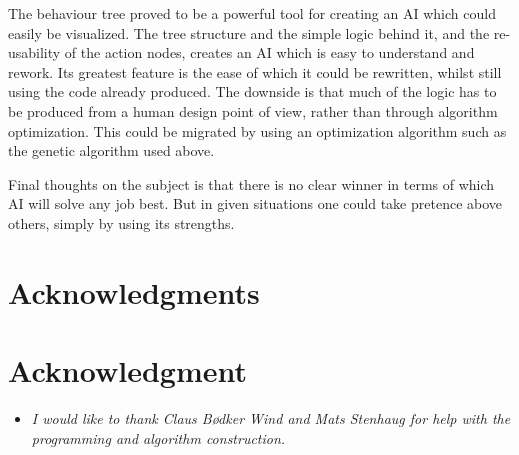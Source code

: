 \documentclass[conference,compsoc]{IEEEtran}
\begin{document}
The behaviour tree proved to be a powerful tool for creating an AI which could easily be visualized. The tree structure and the simple logic behind it, and the re-usability of the action nodes, creates an AI which is easy to understand and rework. Its greatest feature is the ease of which it could be rewritten, whilst still using the code already produced. The downside is that much of the logic has to be produced from a human design point of view, rather than through algorithm optimization. This could be migrated by using an optimization algorithm such as the genetic algorithm used above. 

Final thoughts on the subject is that there is no clear winner in terms of which AI will solve any job best. But in given situations one could take pretence above others, simply by using its strengths. 




\ifCLASSOPTIONcompsoc
  \section*{Acknowledgments}
\else
  \section*{Acknowledgment}
\fi
\begin{itemize}
\item[]\textit{I would like to thank Claus Bødker Wind and Mats Stenhaug for help with the programming and algorithm construction.}
\end{itemize}




%
%
%
\end{document}
